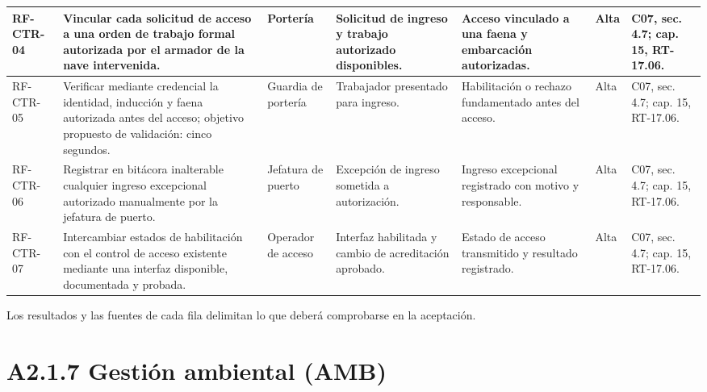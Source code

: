 \begin{longtable}{|L{0.080645\AnchoTablaAnexo}|L{0.262097\AnchoTablaAnexo}|L{0.100806\AnchoTablaAnexo}|L{0.145161\AnchoTablaAnexo}|L{0.173387\AnchoTablaAnexo}|L{0.060484\AnchoTablaAnexo}|L{0.177420\AnchoTablaAnexo}|}
RF-\allowbreak{}CTR-\allowbreak{}04 &
Vincular cada solicitud de acceso a una orden de trabajo formal autorizada por el armador de la nave intervenida. &
Portería &
Solicitud de ingreso y trabajo autorizado disponibles. &
Acceso vinculado a una faena y embarcación autorizadas. &
Alta &
C07, sec. 4.7; cap. 15, RT-17.06. \\ \hline

RF-\allowbreak{}CTR-\allowbreak{}05 &
Verificar mediante credencial la identidad, inducción y faena autorizada antes del acceso; objetivo propuesto de validación: cinco segundos. &
Guardia de portería &
Trabajador presentado para ingreso. &
Habilitación o rechazo fundamentado antes del acceso. &
Alta &
C07, sec. 4.7; cap. 15, RT-17.06. \\ \hline

RF-\allowbreak{}CTR-\allowbreak{}06 &
Registrar en bitácora inalterable cualquier ingreso excepcional autorizado manualmente por la jefatura de puerto. &
Jefatura de puerto &
Excepción de ingreso sometida a autorización. &
Ingreso excepcional registrado con motivo y responsable. &
Alta &
C07, sec. 4.7; cap. 15, RT-17.06. \\ \hline

RF-\allowbreak{}CTR-\allowbreak{}07 &
Intercambiar estados de habilitación con el control de acceso existente mediante una interfaz disponible, documentada y probada. &
Operador de acceso &
Interfaz habilitada y cambio de acreditación aprobado. &
Estado de acceso transmitido y resultado registrado. &
Alta &
C07, sec. 4.7; cap. 15, RT-17.06. \\ \hline

\end{longtable}

Los resultados y las fuentes de cada fila delimitan lo que deberá comprobarse en la aceptación.

\clearpage\section*{A2.1.7 Gestión ambiental (AMB)}


